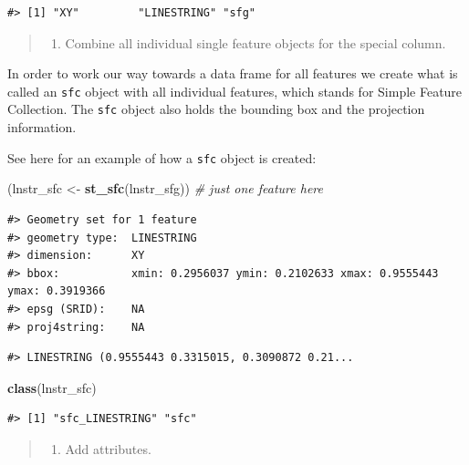 \documentclass[]{book}
\newenvironment{Shaded}{\begin{snugshade}}{\end{snugshade}}
\newcommand{\KeywordTok}[1]{\textcolor[rgb]{0.13,0.29,0.53}{\textbf{#1}}}
\newcommand{\StringTok}[1]{\textcolor[rgb]{0.31,0.60,0.02}{#1}}
\newcommand{\CommentTok}[1]{\textcolor[rgb]{0.56,0.35,0.01}{\textit{#1}}}
\newcommand{\NormalTok}[1]{#1}
\providecommand{\tightlist}{%
  \setlength{\itemsep}{0pt}\setlength{\parskip}{0pt}}
\theoremstyle{definition}
\theoremstyle{definition}
\theoremstyle{definition}
\theoremstyle{remark}
\begin{document}
\begin{verbatim}
#> [1] "XY"         "LINESTRING" "sfg"
\end{verbatim}

\begin{quote}
\begin{enumerate}
\def\labelenumi{\Roman{enumi}.}
\setcounter{enumi}{1}
\tightlist
\item
  Combine all individual single feature objects for the special column.
\end{enumerate}
\end{quote}

In order to work our way towards a data frame for all features we create
what is called an \texttt{sfc} object with all individual features,
which stands for Simple Feature Collection. The \texttt{sfc} object also
holds the bounding box and the projection information.

See here for an example of how a \texttt{sfc} object is created:

\begin{Shaded}
\begin{Highlighting}[]
\NormalTok{(lnstr_sfc <-}\StringTok{ }\KeywordTok{st_sfc}\NormalTok{(lnstr_sfg)) }\CommentTok{# just one feature here}
\end{Highlighting}
\end{Shaded}

\begin{verbatim}
#> Geometry set for 1 feature 
#> geometry type:  LINESTRING
#> dimension:      XY
#> bbox:           xmin: 0.2956037 ymin: 0.2102633 xmax: 0.9555443 ymax: 0.3919366
#> epsg (SRID):    NA
#> proj4string:    NA
\end{verbatim}

\begin{verbatim}
#> LINESTRING (0.9555443 0.3315015, 0.3090872 0.21...
\end{verbatim}

\begin{Shaded}
\begin{Highlighting}[]
\KeywordTok{class}\NormalTok{(lnstr_sfc) }
\end{Highlighting}
\end{Shaded}

\begin{verbatim}
#> [1] "sfc_LINESTRING" "sfc"
\end{verbatim}

\begin{quote}
\begin{enumerate}
\def\labelenumi{\Roman{enumi}.}
\setcounter{enumi}{2}
\tightlist
\item
  Add attributes.
\end{enumerate}
\end{quote}
\end{document}
